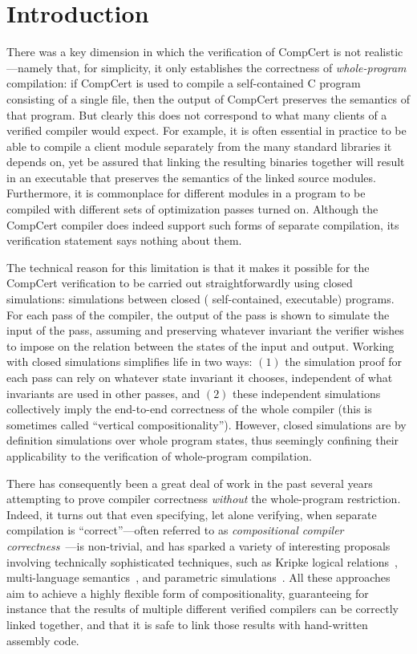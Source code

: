 \section{Introduction}
\label{sec:sepcomp:introduction}

There was a key dimension in which the verification of CompCert is not realistic---namely that, for
simplicity, it only establishes the correctness of \emph{whole-program} compilation: if CompCert is
used to compile a self-contained C program consisting of a single file, then the output of CompCert
preserves the semantics of that program.  But clearly this does not correspond to what many clients
of a verified compiler would expect.  For example, it is often essential in practice to be able to
compile a client module separately from the many standard libraries it depends on, yet be assured
that linking the resulting binaries together will result in an executable that preserves the
semantics of the linked source modules.  Furthermore, it is commonplace for different modules in a
program to be compiled with different sets of optimization passes turned on.  Although the CompCert
compiler does indeed support such forms of separate compilation, its verification statement says
nothing about them.

The technical reason for this limitation is that it makes it possible for the CompCert verification
to be carried out straightforwardly using closed simulations: simulations between closed (\ie
self-contained, executable) programs.  
For each pass of the compiler, the output of the pass is shown to simulate the input of the pass,
assuming and preserving whatever invariant the verifier wishes to impose on the relation between the
states of the input and output.  Working with closed simulations simplifies life in two ways: $(1)$
the simulation proof for each pass can rely on whatever state invariant it chooses, independent of
what invariants are used in other passes, and $(2)$ these independent simulations collectively imply
the end-to-end correctness of the whole compiler (this is sometimes called ``vertical
compositionality'').  However, closed simulations are by definition simulations over whole program
states, thus seemingly confining their applicability to the verification of whole-program
compilation.

There has consequently been a great deal of work in the past several years attempting to prove
compiler correctness \emph{without} the whole-program restriction.  Indeed, it turns out that even
specifying, let alone verifying, when separate compilation is ``correct''---often referred to as
\emph{compositional compiler correctness}~\cite{benton+:icfp09}---is non-trivial, and has sparked a
variety of interesting proposals involving technically sophisticated techniques, such as Kripke
logical relations~\cite{hur+:popl11}, multi-language semantics~\cite{perconti+:esop14}, and
parametric simulations~\cite{hur+:popl12,neis+:icfp15}.  All these approaches aim to achieve a
highly flexible form of compositionality, guaranteeing for instance that the results of multiple
different verified compilers can be correctly linked together, and that it is safe to link those
results with hand-written assembly code.

